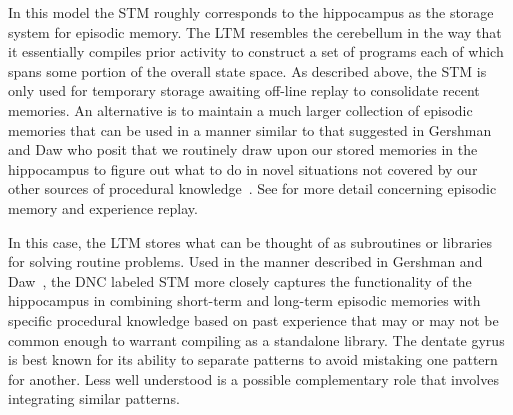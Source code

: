 In this model the STM roughly corresponds to the hippocampus as the storage system for episodic memory. The LTM resembles the cerebellum in the way that it essentially compiles prior activity to construct a set of programs each of which spans some portion of the overall state space. As described above, the STM is only used for temporary storage awaiting off-line replay to consolidate recent memories. An alternative is to maintain a much larger collection of episodic memories that can be used in a manner similar to that suggested in Gershman and Daw who posit that we routinely draw upon our stored memories in the hippocampus to figure out what to do in novel situations not covered by our other sources of procedural knowledge~\cite{GershmanandDawANNUAL-REVIEWS-17}. See {} for more detail concerning episodic memory and experience replay.


 



In this case, the LTM stores what can be thought of as subroutines or libraries for solving routine problems. Used in the manner described in Gershman and Daw~\cite{GershmanandDawANNUAL-REVIEWS-17}, the DNC labeled STM more closely captures the functionality of the hippocampus in combining short-term and long-term episodic memories with specific procedural knowledge based on past experience that may or may not be common enough to warrant compiling as a standalone library. The dentate gyrus is best known for its ability to separate patterns to avoid mistaking one pattern for another. Less well understood is a possible complementary role that involves integrating similar patterns.

